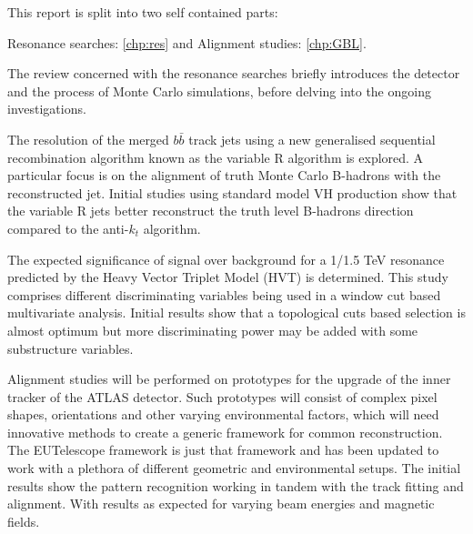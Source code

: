 This report is split into two self contained parts:

Resonance searches: \ref{chp:res} and Alignment studies: \ref{chp:GBL}.

The review concerned with the resonance searches briefly introduces the detector and the process of Monte Carlo simulations, before delving into the ongoing investigations.
   
The resolution of the merged $b\bar{b}$ track jets using a new generalised sequential recombination algorithm known as the variable R algorithm is explored. A particular focus is on the alignment of truth Monte Carlo B-hadrons with the reconstructed jet. Initial studies using standard model VH production show that the variable R jets better reconstruct the truth level B-hadrons direction compared to the anti-$k_t$ algorithm.  

The expected significance of signal over background for a 1/1.5 TeV resonance predicted by the Heavy Vector Triplet Model (HVT) is determined. This study comprises different discriminating variables being used in a window cut based multivariate analysis. Initial results show that a topological cuts based selection is almost optimum but more discriminating power may be added with some substructure variables.


Alignment studies will be performed on prototypes for the upgrade of the inner tracker of the ATLAS detector. Such prototypes will consist of complex pixel shapes, orientations and other varying environmental factors, which will need innovative methods to create a generic framework for common reconstruction. The EUTelescope framework is just that framework and has been updated to work with a plethora of different geometric and environmental setups. The initial results show the pattern recognition working in tandem with the track fitting and alignment. With results as expected for varying beam energies and magnetic fields. 
